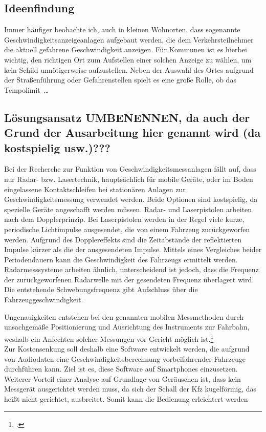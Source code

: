 \subsection{Ideenfindung}
Immer häufiger beobachte ich, auch in kleinen Wohnorten, dass sogenannte Geschwindigkeitsanzeigeanlagen aufgebaut werden, die dem Verkehrsteilnehmer die aktuell gefahrene Geschwindigkeit anzeigen.
Für Kommunen ist es hierbei wichtig, den richtigen Ort zum Aufstellen einer solchen Anzeige zu wählen, um kein Schild unnötigerweise aufzustellen. Neben der Auswahl des Ortes aufgrund der Straßenführung oder Gefahrenstellen spielt es eine große Rolle, ob das Tempolimit \dots

\subsection{Lösungsansatz \textbf{UMBENENNEN, da auch der Grund der Ausarbeitung hier genannt wird (da kostspielig usw.)???}} %
Bei der Recherche zur Funktion von Geschwindigkeitsmessanlagen fällt auf, dass nur Radar- bzw. Lasertechnik, hauptsächlich für mobile Geräte, oder im Boden eingelassene Kontaktschleifen bei stationären Anlagen zur Geschwindigkeitsmessung verwendet werden. Beide Optionen sind kostspielig, da spezielle Geräte angeschafft werden müssen. Radar- und Laserpistolen arbeiten nach dem Dopplerprinzip. Bei Laserpistolen werden in der Regel viele kurze, periodische Lichtimpulse ausgesendet, die von einem Fahrzeug zurückgeworfen werden. Aufgrund des Dopplereffekts sind die Zeitabstände der reflektierten Impulse kürzer als die der ausgesendeten Impulse. Mittels eines Vergleiches beider Periodendauern kann die Geschwindigkeit des Fahrzeugs ermittelt werden. Radarmesssysteme arbeiten ähnlich, unterscheidend ist jedoch, dass die Frequenz der zurückgeworfenen Radarwelle mit der gesendeten Frequenz überlagert wird. Die entstehende Schwebungsfrequenz gibt Aufschluss über die Fahrzeuggeschwindigkeit.

Ungenauigkeiten entstehen bei den genannten mobilen Messmethoden durch unsachgemäße Positionierung und Ausrichtung des Instruments zur Fahrbahn, weshalb ein Anfechten solcher Messungen vor Gericht möglich ist.\footcite{AnfechtenMobileMessmethoden}\\

Zur Kostensenkung soll deshalb eine Software entwickelt werden, die aufgrund von Audiodaten eine Geschwindigkeitsberechnung vorbeifahrender Fahrzeuge durchführen kann. Ziel ist es, diese Software auf Smartphones einzusetzen. Weiterer Vorteil einer Analyse auf Grundlage von Geräuschen ist, dass kein Messgerät ausgerichtet werden muss, da sich der Schall der Kfz kugelförmig, das heißt nicht gerichtet, ausbreitet. Somit kann die Bedienung erleichtert werden %